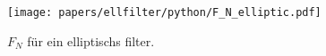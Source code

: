 \begin{refsection}
\begin{figure}
    \centering
    \texttt{[image: papers/ellfilter/python/F\_N\_elliptic.pdf]}
    \caption{$F_N$ für ein elliptischs filter.}
    \label{ellfilter:fig:elliptic}
\end{figure}










\end{refsection}

